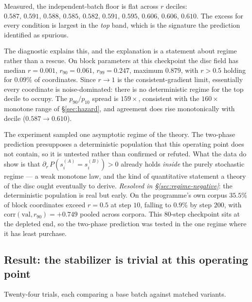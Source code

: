 Measured, the independent-batch floor is flat across $r$ deciles:
$0.587,\,0.591,\,0.588,\,0.585,\,0.582,\,0.591,\,0.595,\,0.606,\,0.606,\,0.610$.
The excess for every condition is largest in the \emph{top} band, which is the
signature the prediction identified as spurious.

The diagnostic explains this, and the explanation is a statement about regime
rather than a rescue. On block parameters at this checkpoint the disc field has
median $r=0.001$, $r_{90}=0.061$, $r_{99}=0.247$, maximum $0.879$, with
$r>0.5$ holding for $0.09\%$ of coordinates. Since $r\to1$ is the
consistent-gradient limit, essentially every coordinate is noise-dominated:
there is no deterministic regime for the top decile to occupy. The $p_{90}/p_{10}$
spread is $159\times$, consistent with the $160\times$ monotone range of
\S\ref{sec:hazard}, and agreement does rise monotonically with decile
($0.587\to0.610$).

\begin{observation}
\label{obs:regime}
The experiment sampled one asymptotic regime of the theory. The two-phase
prediction presupposes a deterministic population that this operating point
does not contain, so it is untested rather than confirmed or refuted. What the
data do show is that
$\partial_r\,P\!\left(s_i^{(A)}=s_i^{(B)}\right)>0$ already holds \emph{inside}
the purely stochastic regime --- a weak monotone law, and the kind of
quantitative statement a theory of the disc ought eventually to derive.
\emph{Resolved in \S\ref{sec:regime-negative}}: the deterministic population
is real but early. On the programme's own corpus $35.5\%$ of block
coordinates exceed $r=0.5$ at step $10$, falling to $0.9\%$ by step $200$,
with $\mathrm{corr}(\text{val},r_{90})=+0.749$ pooled across corpora. This
$80$-step checkpoint sits at the depleted end, so the two-phase prediction was
tested in the one regime where it has least purchase.
\end{observation}

\subsection{Result: the stabilizer is trivial at this operating point}
\label{sec:stabilizer-result}

Twenty-four trials, each comparing a base batch against matched variants.

